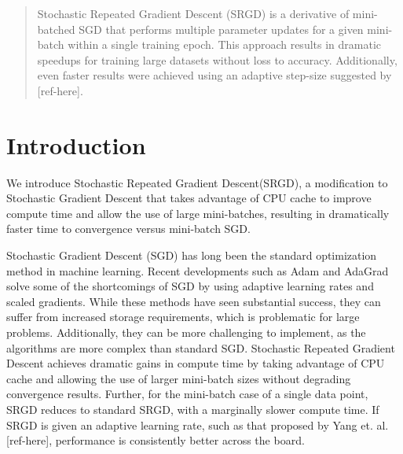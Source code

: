 \documentclass[conference,compsoc]{IEEEtran}
\begin{document}
\maketitle

\begin{abstract}
    Stochastic Repeated Gradient Descent (SRGD) is a derivative of mini-batched
    SGD that performs multiple parameter updates for a given mini-batch within a
    single training epoch. This approach results in dramatic speedups for
    training large datasets without loss to accuracy. Additionally, even faster
    results were achieved using an adaptive step-size suggested by [ref-here].
\end{abstract}





%
\IEEEpeerreviewmaketitle



\section{Introduction}
We introduce Stochastic Repeated Gradient Descent(SRGD), a modification to
Stochastic Gradient Descent that takes advantage of CPU cache to improve compute
time and allow the use of large mini-batches, resulting in dramatically faster
time to convergence versus mini-batch SGD. 

Stochastic Gradient Descent (SGD) has long been the standard optimization method
in machine learning. Recent developments such as Adam and AdaGrad solve some of
the shortcomings of SGD by using adaptive learning rates and scaled gradients.
While these methods have seen substantial success, they can suffer from increased
storage requirements, which is problematic for large problems. Additionally,
they can be more challenging to implement, as the algorithms are more complex
than standard SGD. Stochastic Repeated Gradient Descent achieves dramatic gains
in compute time by taking advantage of CPU cache and allowing the use of larger
mini-batch sizes without degrading convergence results. Further, for the
mini-batch case of a single data point, SRGD reduces to standard SRGD, with a
marginally slower compute time. If SRGD is given an adaptive learning rate, such
as that proposed by Yang et. al. [ref-here], performance is consistently better
across the board.
\end{document}
